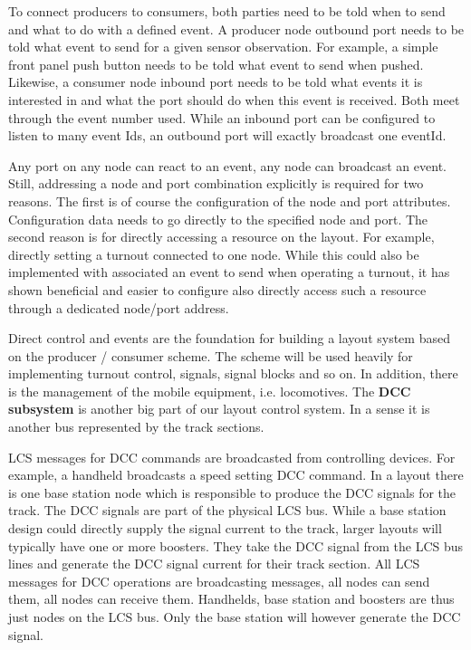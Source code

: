 To connect producers to consumers, both parties need to be told when to send and what to do with a defined event. A producer node outbound port needs to be told what event to send for a given sensor observation. For example, a simple front panel push button needs to be told what event to send when pushed. Likewise, a consumer node inbound port needs to be told what events it is interested in and what the port should do when this event is received. Both meet through the event number used. While an inbound port can be configured to listen to many event Ids, an outbound port will exactly broadcast one eventId.

Any port on any node can react to an event, any node can broadcast an event. Still, addressing a node and port combination explicitly is required for two reasons. The first is of course the configuration of the node and port attributes. Configuration data needs to go directly to the specified node and port. The second reason is for directly accessing a resource on the layout. For example, directly setting a turnout connected to one node. While this could also be implemented with associated an event to send when operating a turnout, it has shown beneficial and easier to configure also directly access such a resource through a dedicated node/port address.



Direct control and events are the foundation for building a layout system based on the producer / consumer scheme. The scheme will be used heavily for implementing turnout control, signals, signal blocks and so on. In addition, there is the management of the mobile equipment, i.e. locomotives. The \textbf{DCC subsystem} is another big part of our layout control system. In a sense it is another bus represented by the track sections.

\begin{center}
\end{center}


LCS messages for DCC commands are broadcasted from controlling devices. For example, a handheld broadcasts a speed setting DCC command. In a layout there is one base station node which is responsible to produce the DCC signals for the track. The DCC signals are part of the physical LCS bus. While a base station design could directly supply the signal current to the track, larger layouts will typically have one or more boosters. They take the DCC signal from the LCS bus lines and generate the DCC signal current for their track section. All LCS messages for DCC operations are broadcasting messages, all nodes can send them, all nodes can receive them. Handhelds, base station and boosters are thus just nodes on the LCS bus. Only the base station will however generate the DCC signal.

